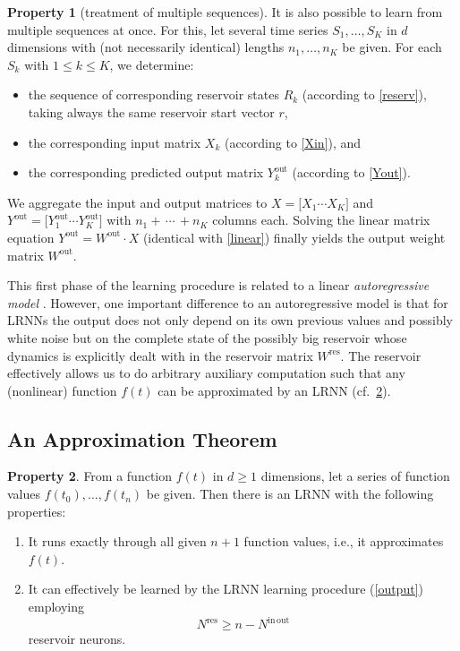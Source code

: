 \documentclass{sn-jnl}
\theoremstyle{definition}
\newtheorem{prop}{Property}
\begin{document}
\begin{prop}[treatment of multiple sequences]\label{multi}
It is also possible to learn from multiple sequences at once. For this, let
several time series $S_1,\dots,S_K$ in $d$ dimensions with (not necessarily
identical) lengths $n_1,\dots,n_K$ be given. For each $S_k$ with $1 \le k \le
K$, we determine:
\begin{itemize}
  \item the sequence of corresponding reservoir states $R_k$ (according to
	\cref{reserv}), taking always the same reservoir start vector $r$,
  \item the corresponding input matrix $X_k$ (according to \cref{Xin}), and
  \item the corresponding predicted output matrix $Y^\mathrm{out}_k$ (according to \cref{Yout}).
\end{itemize}
We aggregate the input and output matrices to $X = \big[ X_1 \cdots X_K \big]$
and $Y^\mathrm{out} = \big[ Y^\mathrm{out}_1 \cdots Y^\mathrm{out}_K \big]$ with
$n_1+\,\cdots\,+n_K$ columns each. Solving the linear matrix equation
$Y^\mathrm{out} = W^\mathrm{out} \cdot X$ (identical with \cref{linear})
finally yields the output weight matrix $W^\mathrm{out}$.
\end{prop}

This first phase of the learning procedure is related to a linear
\emph{autoregressive model} \citep{Aka69}. However, one important
difference to an autoregressive model is that for LRNNs the output does not only
depend on its own previous values and possibly white noise but on the complete
state of the possibly big reservoir whose dynamics is explicitly dealt with in
the reservoir matrix $W^\mathrm{res}$. The reservoir effectively allows us to do
arbitrary auxiliary computation such that any (nonlinear) function $f(t)$ can
be approximated by an LRNN (cf.~\cref{approx}).

\subsection{An Approximation Theorem}

\begin{prop}\label{approx}
From a function $f(t)$ in $d \ge 1$ dimensions, let a
series of function values $f(t_0),\dots,f(t_n)$ be given. Then there is an
LRNN with the following properties:
\begin{enumerate}
  \item It runs exactly through all given $n+1$ function values, i.e., it approximates $f(t)$.
  \item It can effectively be learned by the LRNN learning procedure (\cref{output}) employing
	\begin{equation}\label{ineq}
	  N^\mathrm{res} \ge n-N^\mathrm{in\,out}
	\end{equation}
	reservoir neurons.
\end{enumerate}
\end{prop}
\end{document}
